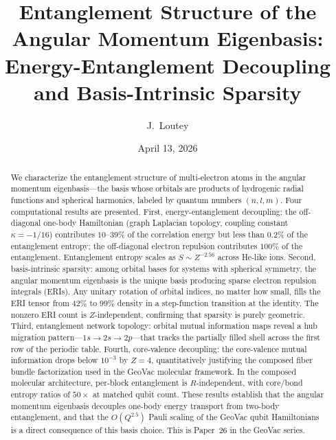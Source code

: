 \documentclass[twocolumn,pra,amsmath,amssymb,superscriptaddress]{revtex4-2}
\begin{document}
\title{Entanglement Structure of the Angular Momentum Eigenbasis:\\
Energy-Entanglement Decoupling and Basis-Intrinsic Sparsity}

\author{J.~Loutey}

\date{April 13, 2026}

\begin{abstract}
We characterize the entanglement structure of multi-electron atoms
in the angular momentum eigenbasis---the basis whose orbitals are
products of hydrogenic radial functions and spherical harmonics,
labeled by quantum numbers $(n, l, m)$.  Four computational results
are presented.
First, energy-entanglement decoupling: the off-diagonal one-body
Hamiltonian (graph Laplacian topology, coupling constant
$\kappa = -1/16$) contributes $10$--$39\%$ of the correlation
energy but less than $0.2\%$ of the entanglement entropy; the
off-diagonal electron repulsion contributes $100\%$ of the
entanglement.  Entanglement entropy scales as $S \sim Z^{-2.56}$
across He-like ions.
Second, basis-intrinsic sparsity: among orbital bases for systems
with spherical symmetry, the angular momentum eigenbasis is the
unique basis producing sparse electron repulsion integrals (ERIs).
Any unitary rotation of orbital indices, no matter how small, fills
the ERI tensor from $42\%$ to $99\%$ density in a step-function
transition at the identity.  The nonzero ERI count
is $Z$-independent, confirming that sparsity is purely geometric.
Third, entanglement network topology: orbital mutual information
maps reveal a hub migration pattern---$1s \to 2s \to 2p$---that
tracks the partially filled shell across the first row of the
periodic table.
Fourth, core-valence decoupling: the core-valence mutual
information drops below $10^{-3}$ by $Z = 4$, quantitatively
justifying the composed fiber bundle factorization used in the
GeoVac molecular framework.
In the composed molecular architecture, per-block entanglement is
$R$-independent, with core/bond entropy ratios of $50\times$ at
matched qubit count.
These results establish that the angular momentum eigenbasis
decouples one-body energy transport from two-body entanglement,
and that the $O(Q^{2.5})$ Pauli scaling of the GeoVac qubit
Hamiltonians is a direct consequence of this basis choice.
This is Paper~26 in the GeoVac series.
\end{abstract}

\maketitle
\end{document}
